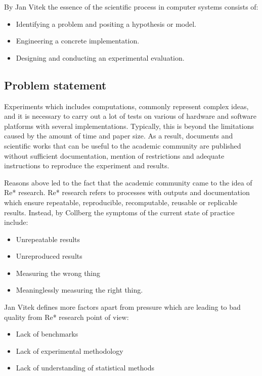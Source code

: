 \documentclass{vldb}
\begin{document}
\par By Jan Vitek\cite{DBLP:conf/emsoft/VitekK11} the essence of the scientific process in computer systems consists of:
\begin{itemize}
    \item Identifying a problem and positing a hypothesis or model.
    \item Engineering a concrete implementation.
    \item Designing and conducting an experimental evaluation.
\end{itemize} \par

\subsection{Problem statement}
Experiments which includes computations, commonly represent complex ideas, and it is necessary to carry out a lot of tests on various of hardware and software platforms with several implementations. Typically, this is beyond the limitations caused by the amount of time and paper size. As a result, documents and scientific works that can be useful to the academic community are published without sufficient documentation, mention of restrictions and adequate instructions to reproduce the experiment and results. \par
Reasons above led to the fact that the academic community came to the idea of Re* research. Re* research refers to processes with outputs and documentation which ensure repeatable, reproducible, recomputable, reusable or replicable results. Instead, by Collberg\cite{DBLP:journals/cacm/CollbergP16} the symptoms of the current state of practice include:
\begin{itemize}
    \item Unrepeatable results
    \item Unreproduced results 
    \item Measuring the wrong thing 
    \item Meaninglessly measuring the right thing. 
\end{itemize} \par
Jan Vitek\cite{DBLP:conf/emsoft/VitekK11} defines more factors apart from pressure which are leading to bad quality from Re* research point of view:
\begin{itemize}
    \item Lack of benchmarks
    \item Lack of experimental methodology
    \item Lack of understanding of statistical methods
\end{itemize}
\end{document}
